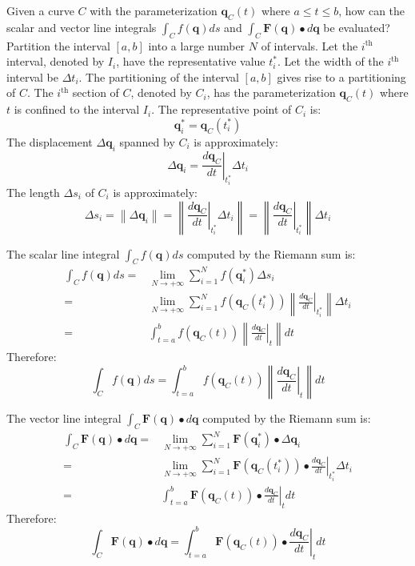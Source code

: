 \documentclass{article}
\begin{document}
Given a curve \(C\) with the parameterization \(\mathbf{q}_C(t)\) where \(a \leq t \leq b\), how can the scalar and vector line integrals \(\int_C f(\mathbf{q})ds\) and \(\int_C \mathbf{F}(\mathbf{q}) \bullet d\mathbf{q}\) be evaluated? Partition the interval \([a, b]\) into a large number \(N\) of intervals. Let the \(i^{\text{th}}\) interval, denoted by \(I_i\), have the representative value \(t_i^*\). Let the width of the \(i^{\text{th}}\) interval be \(\Delta t_i\). The partitioning of the interval \([a, b]\) gives rise to a partitioning of \(C\). The \(i^{\text{th}}\) section of \(C\), denoted by \(C_i\), has the parameterization \(\mathbf{q}_C(t)\) where \(t\) is confined to the interval \(I_i\). The representative point of \(C_i\) is:
\[\mathbf{q}_i^* = \mathbf{q}_C(t_i^*)\]
The displacement \(\Delta\mathbf{q}_i\) spanned by \(C_i\) is approximately: 
\[\Delta\mathbf{q}_i = \left.\frac{d\mathbf{q}_C}{dt}\right|_{t_i^*}\Delta t_i\] 
The length \(\Delta s_i\) of \(C_i\) is approximately: 
\[\Delta s_i = \left\|\Delta\mathbf{q}_i\right\| = \left\|\left.\frac{d\mathbf{q}_C}{dt}\right|_{t_i^*}\Delta t_i\right\| = \left\|\left.\frac{d\mathbf{q}_C}{dt}\right|_{t_i^*}\right\|\Delta t_i\]       

The scalar line integral \(\int_C f(\mathbf{q})ds\) computed by the Riemann sum is: 
\begin{align*}
\int_C f(\mathbf{q})ds 
= & \lim_{N \rightarrow +\infty} \sum_{i=1}^N f(\mathbf{q}_i^*) \Delta s_i \\ 
= & \lim_{N \rightarrow +\infty} \sum_{i=1}^N f(\mathbf{q}_C(t_i^*)) \left\|\left.\frac{d\mathbf{q}_C}{dt}\right|_{t_i^*}\right\|\Delta t_i \\   
= & \int_{t = a}^b f(\mathbf{q}_C(t)) \left\|\left.\frac{d\mathbf{q}_C}{dt}\right|_{t}\right\| dt  
\end{align*}
Therefore:
\[\int_C f(\mathbf{q})ds = \int_{t = a}^b f(\mathbf{q}_C(t)) \left\|\left.\frac{d\mathbf{q}_C}{dt}\right|_{t}\right\| dt\]

The vector line integral \(\int_C \mathbf{F}(\mathbf{q}) \bullet d\mathbf{q}\) computed by the Riemann sum is: 
\begin{align*}
\int_C \mathbf{F}(\mathbf{q}) \bullet d\mathbf{q} 
= & \lim_{N \rightarrow +\infty} \sum_{i=1}^N \mathbf{F}(\mathbf{q}_i^*) \bullet \Delta \mathbf{q}_i \\ 
= & \lim_{N \rightarrow +\infty} \sum_{i=1}^N \mathbf{F}(\mathbf{q}_C(t_i^*)) \bullet \left.\frac{d\mathbf{q}_C}{dt}\right|_{t_i^*} \Delta t_i \\   
= & \int_{t = a}^b \mathbf{F}(\mathbf{q}_C(t)) \bullet \left.\frac{d\mathbf{q}_C}{dt}\right|_{t} dt  
\end{align*}
Therefore:
\[\int_C \mathbf{F}(\mathbf{q}) \bullet d\mathbf{q} = \int_{t = a}^b \mathbf{F}(\mathbf{q}_C(t)) \bullet \left.\frac{d\mathbf{q}_C}{dt}\right|_{t} dt\]
\end{document}
